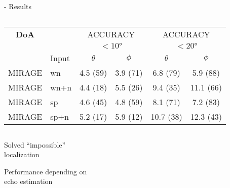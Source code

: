 \begin{frame}{\mirage - Results}
\begin{columns}[T,onlytextwidth]
        \begin{column}{.74\textwidth}
            \centering
            \small
            \begin{tabular}{cl|cc|cc}
            \toprule
            \textbf{DoA}      &               &  \multicolumn{2}{c|}{ACCURACY} &   \multicolumn{2}{c}{ACCURACY} \\
                            &               &  \multicolumn{2}{c|}{$<\ang{10}$} &   \multicolumn{2}{c}{$<\ang{20}$} \\
                            &    Input    &  $\theta$ &  $\phi$ &  $\theta$ &  $\phi$ \\
            \midrule
            MIRAGE &  wn           &   4.5 (59) &  3.9 (71) &   6.8 (79) &   5.9 (88) \\
            MIRAGE &  wn+n     &   4.4 (18) &  5.5 (26) &   9.4 (35) &  11.1 (66) \\
            MIRAGE &  sp       &   4.6 (45) &  4.8 (59) &   8.1 (71) &   7.2 (83) \\
            MIRAGE &  sp+n &   5.2 (17) &  5.9 (12) &  10.7 (38) &  12.3 (43) \\
            \bottomrule
        \end{tabular}

        \end{column}

    \end{columns}

    \begin{center}
        \textcolor{mygreen}{\cmark \: \parbox{12em}{Solved ``impossible''\\localization}}
        \quad \textcolor{myred}{\xmark \: \parbox{12em}{Performance depending on\\echo estimation}}
    \end{center}

\end{frame}







